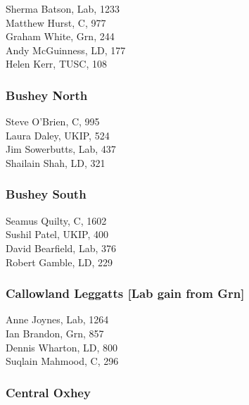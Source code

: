 \documentclass[a4paper,openany,10pt]{book}
\begin{document}
Sherma Batson, Lab, 1233\\
Matthew Hurst, C, 977\\
Graham White, Grn, 244\\
Andy McGuinness, LD, 177\\
Helen Kerr, TUSC, 108\\


\subsubsection*{Bushey North}



Steve O'Brien, C, 995\\
Laura Daley, UKIP, 524\\
Jim Sowerbutts, Lab, 437\\
Shailain Shah, LD, 321\\


\subsubsection*{Bushey South}



Seamus Quilty, C, 1602\\
Sushil Patel, UKIP, 400\\
David Bearfield, Lab, 376\\
Robert Gamble, LD, 229\\


\subsubsection*{Callowland Leggatts \hspace*{\fill}\nolinebreak[1]%
\enspace\hspace*{\fill}
[Lab gain from Grn]}



Anne Joynes, Lab, 1264\\
Ian Brandon, Grn, 857\\
Dennis Wharton, LD, 800\\
Suqlain Mahmood, C, 296\\


\subsubsection*{Central Oxhey}
\end{document}

